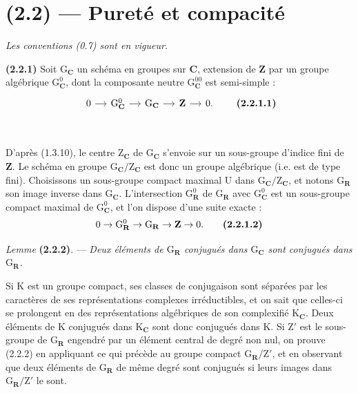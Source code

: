 \documentclass[11pt,leqno]{article}
\newcommand{\Page}[1]{\ifvmode\noindent\else\unskip\ \fi{\footnotesize\textcolor{gray}{[p.\,#1]}}\ \ignorespaces}
\begin{document}
\section*{(2.2) — Pureté et compacité}

\textit{Les conventions \textup{(0.7)} sont en vigueur.}

\textbf{(2.2.1)} Soit \(\mathrm{G}_{\mathbf{C}}\) un schéma en groupes sur \(\mathbf{C}\), extension de \(\mathbf{Z}\) par un groupe algébrique \(\mathrm{G}_{\mathbf{C}}^0\), dont la composante neutre \(\mathrm{G}_{\mathbf{C}}^{00}\) est semi-simple :
\[
\begin{tikzcd}[column sep=1.2em]
0 \arrow[r]
  & \mathrm{G}_{\mathbf{C}}^0 \arrow[r]
  & \mathrm{G}_{\mathbf{C}} \arrow[r]
  & \mathbf{Z} \arrow[r]
  & 0.
\end{tikzcd}
\tag*{\textbf{(2.2.1.1)}}
\]

\Page{193}

D’après (1.3.10), le centre \(\mathrm Z_{\mathbf C}\) de \(\mathrm G_{\mathbf C}\) s’envoie sur un sous-groupe d’indice fini de \(\mathbf Z\). Le schéma en groupe \(\mathrm G_{\mathbf C}/\mathrm Z_{\mathbf C}\) est donc un groupe algébrique (i.e. est de type fini). Choisissons un sous-groupe compact maximal \(\mathrm U\) dans \(\mathrm G_{\mathbf C}/\mathrm Z_{\mathbf C}\), et notons \(\mathrm G_{\mathbf R}\) son image inverse dans \(\mathrm G_{\mathbf C}\). L’intersection \(\mathrm G_{\mathbf R}^0\) de \(\mathrm G_{\mathbf R}\) avec \(\mathrm G_{\mathbf C}^0\) est un sous-groupe compact maximal de \(\mathrm G_{\mathbf C}^0\), et l’on dispose d’une suite exacte :
\[
0\to\mathrm G_{\mathbf R}^0\to\mathrm G_{\mathbf R}\to\mathbf Z\to0.
\tag*{\textbf{(2.2.1.2)}}
\]

\textit{Lemme} \textbf{(2.2.2)}. — \textit{Deux éléments de \(\mathrm G_{\mathbf R}\) conjugués dans \(\mathrm G_{\mathbf C}\) sont conjugués dans \(\mathrm G_{\mathbf R}\).}

Si \(\mathrm K\) est un groupe compact, ses classes de conjugaison sont séparées par les caractères de ses représentations complexes irréductibles, et on sait que celles-ci se prolongent en des représentations algébriques de son complexifié \(\mathrm K_{\mathbf C}\). Deux éléments de \(\mathrm K\) conjugués dans \(\mathrm K_{\mathbf C}\) sont donc conjugués dans \(\mathrm K\). Si \(\mathrm Z'\) est le sous-groupe de \(\mathrm G_{\mathbf R}\) engendré par un élément central de degré non nul, on prouve (2.2.2) en appliquant ce qui précède au groupe compact \(\mathrm G_{\mathbf R}/\mathrm Z'\), et en observant que deux éléments de \(\mathrm G_{\mathbf R}\) de même degré sont conjugués si leurs images dans \(\mathrm G_{\mathbf R}/\mathrm Z'\) le sont.
\end{document}
